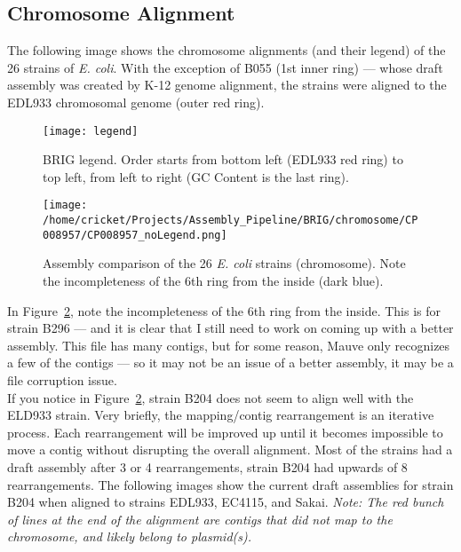 \documentclass[11pt]{article}
\begin{document}
\subsection*{Chromosome Alignment}
The following image shows the chromosome alignments (and their legend) of the 26 strains of \textit{E. coli}. With the exception of B055 (1st inner ring) --- whose draft assembly was created by K-12 genome alignment, the strains were aligned to the EDL933 chromosomal genome (outer red ring). 

\begin{figure}[h!]\normalsize %
\centering
\texttt{[image: legend]}
\caption{BRIG legend. Order starts from bottom left (EDL933 red ring) to top left, from left to right (GC Content is the last ring).}
\label{brig_legend}
\end{figure}

\clearpage

\begin{figure}[h!]\normalsize %
\centering
\texttt{[image: /home/cricket/Projects/Assembly\_Pipeline/BRIG/chromosome/CP008957/CP008957\_noLegend.png]}
\caption{Assembly comparison of the 26 \textit{E. coli} strains (chromosome). Note the incompleteness of the 6th ring from the inside (dark blue).}
\label{chromosomeAlignment}
\end{figure}
\clearpage

In Figure~\ref{chromosomeAlignment}, note the incompleteness of the 6th ring from the inside. This is for strain B296 --- and it is clear that I still need to work on coming up with a better assembly. This file has many contigs, but for some reason, Mauve only recognizes a few of the contigs --- so it may not be an issue of a better assembly, it may be a file corruption issue.  \\

If you notice in Figure~\ref{chromosomeAlignment}, strain B204 does not seem to align well with the ELD933 strain. Very briefly, the mapping/contig rearrangement is an iterative process. Each rearrangement will be improved up until it becomes impossible to move a contig without disrupting the overall alignment. Most of the strains had a draft assembly after 3 or 4 rearrangements, strain B204 had upwards of 8 rearrangements. The following images show the current draft assemblies for strain B204 when aligned to strains EDL933, EC4115, and Sakai. \textit{Note: The red bunch of lines at the end of the alignment are contigs that did not map to the chromosome, and likely belong to plasmid(s).}
\end{document}
